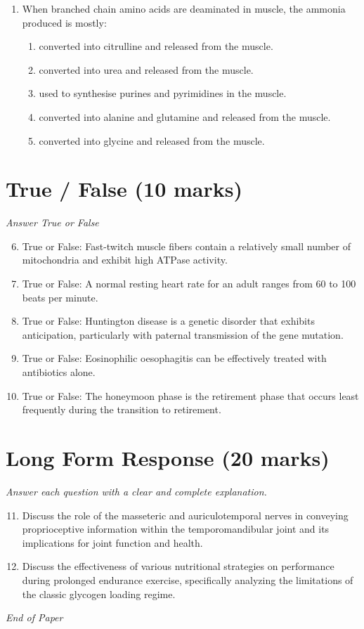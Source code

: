 \documentclass[12pt]{article}
\begin{document}
\begin{enumerate}[label=\arabic*.]
\begin{enumerate}[label=(\alph*)]
    \item Openness to experience
    \item Conscientiousness
\end{enumerate}
\item When branched chain amino acids are deaminated in muscle, the ammonia produced is mostly:
\begin{enumerate}[label=(\alph*)]
    \item converted into citrulline and released from the muscle.
    \item converted into urea and released from the muscle.
    \item used to synthesise purines and pyrimidines in the muscle.
    \item converted into alanine and glutamine and released from the muscle.
    \item converted into glycine and released from the muscle.
\end{enumerate}
\end{enumerate}

\section*{True / False (10 marks)}
\textit{Answer True or False}
\begin{enumerate}[label=\arabic*.]
\setcounter{enumi}{5}
\item True or False: Fast-twitch muscle fibers contain a relatively small number of mitochondria and exhibit high ATPase activity.
\item True or False: A normal resting heart rate for an adult ranges from 60 to 100 beats per minute.
\item True or False: Huntington disease is a genetic disorder that exhibits anticipation, particularly with paternal transmission of the gene mutation.
\item True or False: Eosinophilic oesophagitis can be effectively treated with antibiotics alone.
\item True or False: The honeymoon phase is the retirement phase that occurs least frequently during the transition to retirement.
\end{enumerate}

\section*{Long Form Response (20 marks)}
\textit{Answer each question with a clear and complete explanation.}
\begin{enumerate}[label=\arabic*.]
\setcounter{enumi}{10}
\item Discuss the role of the masseteric and auriculotemporal nerves in conveying proprioceptive information within the temporomandibular joint and its implications for joint function and health.
\item Discuss the effectiveness of various nutritional strategies on performance during prolonged endurance exercise, specifically analyzing the limitations of the classic glycogen loading regime.
\end{enumerate}

\vfill
\noindent\textit{End of Paper}
\end{document}

